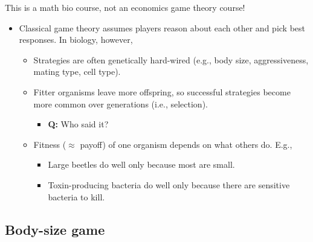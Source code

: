 \documentclass[20pt]{extarticle}
\begin{document}
This is a math bio course, not an economics game theory course!

\begin{itemize}
\item Classical game theory assumes players reason about each other and pick best responses. In biology, however,
	\begin{itemize}
	\item Strategies are often genetically hard-wired (e.g., body size, aggressiveness, mating type, cell type).
	\item Fitter organisms leave more offspring, so successful strategies become more common over generations (i.e., selection).
		\begin{itemize}
		\item \textbf{Q:} Who said it?
		\end{itemize}
	\item Fitness ($\approx$ payoff) of one organism depends on what others do. E.g.,
		\begin{itemize}
		\item Large beetles do well only because most are small.
		\item Toxin-producing bacteria do well only because there are sensitive bacteria to kill.
		\end{itemize}
	\end{itemize}
\end{itemize}

\subsection*{Body-size game}
\end{document}
